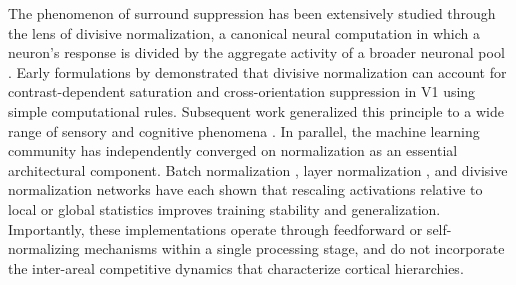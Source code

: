 %
The phenomenon of surround suppression has been extensively studied through the lens of divisive normalization, a canonical neural computation in which a neuron's response is divided by the aggregate activity of a broader neuronal pool \citep{Carandini2011}. Early formulations by \citet{Heeger1992} demonstrated that divisive normalization can account for contrast-dependent saturation and cross-orientation suppression in V1 using simple computational rules. Subsequent work generalized this principle to a wide range of sensory and cognitive phenomena \citep{Reynolds2009,Louie2013}. In parallel, the machine learning community has independently converged on normalization as an essential architectural component. Batch normalization \citep{Ioffe15}, layer normalization \citep{Ba2016}, and divisive normalization networks \citep{Ren2016} have each shown that rescaling activations relative to local or global statistics improves training stability and generalization. Importantly, these implementations operate through feedforward or self-normalizing mechanisms within a single processing stage, and do not incorporate the inter-areal competitive dynamics that characterize cortical hierarchies.


